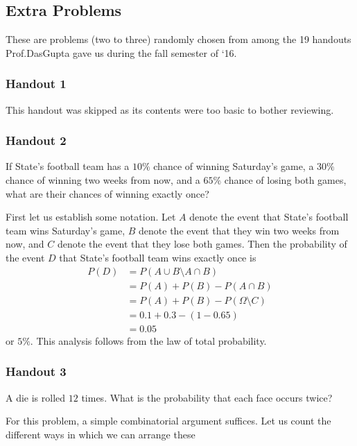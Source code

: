\subsection{Extra Problems}
These are problems (two to three) randomly chosen from among the 19
handouts Prof.\@ DasGupta gave us during the fall semester of `16.
\subsubsection{Handout 1}
This handout was skipped as its contents were too basic to bother
reviewing.
\subsubsection{Handout 2}
\begin{problem}[Handout 2, \# 3]
  If State's football team has a \(10\%\) chance of winning Saturday's
  game, a \(30\%\) chance of winning two weeks from now, and a \(65\%\)
  chance of losing both games, what are their chances of winning exactly
  once?
\end{problem}
\begin{solution*}
  First let us establish some notation. Let \(A\) denote the event that
  State's football team wins Saturday's game, \(B\) denote the event that
  they win two weeks from now, and \(C\) denote the event that they lose
  both games. Then the probability of the event \(D\) that State's football
  team wins exactly once is
  \begin{align*}
    P(D)
    &=P(A\cup B\setminus A\cap B)\\
    &=P(A)+P(B)-P(A\cap B)\\
    &=P(A)+P(B)-P(\Omega\setminus C)\\
    &=0.1+0.3-(1-0.65)\\
    &=0.05
  \end{align*}
  or \(5\%\). This analysis follows from the law of total probability.
\end{solution*}

\subsubsection{Handout 3}
\begin{problem}[Handout 3, \# 4]
  A die is rolled \(12\) times. What is the probability that each face
  occurs twice?
\end{problem}
\begin{solution*}
  For this problem, a simple combinatorial argument suffices. Let us count
  the different ways in which we can arrange these
\end{solution*}


